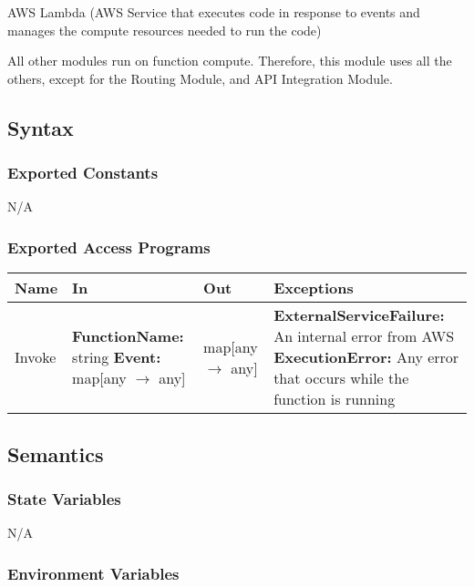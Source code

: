 \documentclass[12pt, titlepage]{article}
\begin{document}
{  AWS Lambda (AWS Service that executes code in response to events and
  manages the compute resources needed to run the code)

  All other modules run on function compute. Therefore, this module
  uses all the others, except for the Routing Module, and API
  Integration Module.

  \subsection{Syntax}

  \subsubsection{Exported Constants}

  N/A

  \subsubsection{Exported Access Programs}

  \begin{center}
    \begin{tabular}{>{\raggedright}p{3cm} >{\raggedright}p{5cm}
      >{\raggedright}p{4cm} p{4cm}}
      \hline
      \textbf{Name} & \textbf{In} & \textbf{Out} & \textbf{Exceptions} \\
      \hline
      Invoke & \textbf{FunctionName:} string \newline \textbf{Event:}
      map[any $\rightarrow$ any] & map[any $\rightarrow$ any] &
      \textbf{ExternalServiceFailure:} An internal error from AWS
      \newline \textbf{ExecutionError:} Any error that occurs while the
      function is running \\
      \hline
    \end{tabular}
  \end{center}

  \subsection{Semantics}

  \subsubsection{State Variables}

  N/A

  \subsubsection{Environment Variables}

}
\end{document}

